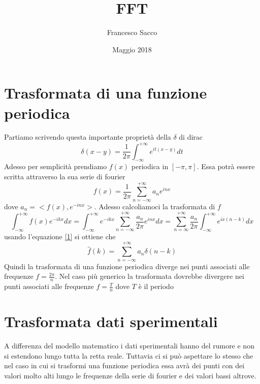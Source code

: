 \documentclass[11pt,a4paper]{article}
\date{Maggio 2018}
\title{FFT}
\author{Francesco Sacco}
\begin{document}
\maketitle
\section{Trasformata di una funzione periodica}
	Partiamo scrivendo questa importante proprietà della $\delta$ di dirac
	\begin{equation}
	\label{1}
		\delta(x-y)=\frac{1}{2\pi} \int_{-\infty}^{+\infty} e^{it(x-y)} dt
	\end{equation}
	Adesso per semplicità prendiamo $f(x)$ periodica in $[-\pi,\pi]$. Essa potrà essere scritta attraverso la sua serie di fourier
	\begin{equation}
		f(x)=\frac{1}{2\pi}\sum_{n=-\infty}^{+\infty}a_n e^{inx}
	\end{equation}
	dove $a_n= <f(x),e^{-inx}>$.
	Adesso calcoliamoci la trasformata di $f$
	\[
		\int_{-\infty}^{+\infty}f(x)e^{-ikx}dx=
		\int_{-\infty}^{+\infty}e^{-ikx}\sum_{n=-\infty}^{+\infty}\frac{a_n}{2\pi} e^{inx}dx=
		\sum_{n=\infty}^{+\infty}\frac{a_n}{2\pi}\int_{-\infty}^{+\infty}e^{ix(n-k)}dx
	\]
	usando l'equazione \ref{1} si ottiene che 
	\begin{equation}
		\widehat{f}(k)=\sum_{n=-\infty}^{+\infty}a_n\delta(n-k)
	\end{equation}
	Quindi la trasformata di una funzione periodica diverge nei punti associati alle frequenze $f=\frac{2\pi}{n}$.
	Nel caso più generico la trasformata dovrebbe divergere nei punti associati alle frequenze $f=\frac{T}{n}$ dove $T$ è il periodo
	
\section{Trasformata dati sperimentali}
	A differenza del modello matematico i dati sperimentali hanno del rumore e non si estendono lungo tutta la retta reale.
	Tuttavia ci si può aspettare lo stesso che nel caso in cui si trasformi una funzione periodica essa avrà dei punti con dei valori molto alti lungo le frequenze della serie di fourier e dei valori bassi altrove.
\end{document}
